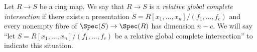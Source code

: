 \begin{definition}
\label{definition-relative-global-complete-intersection}
Let $R \to S$ be a ring map. We say that $R \to S$ is
a {\it relative global complete intersection} if there exists
a presentation $S = R[x_1, \ldots, x_n]/(f_1, \ldots, f_c)$ and
every nonempty fibre of $\Spec(S) \to \Spec(R)$ has dimension $n - c$.
We will say ``let $S = R[x_1, \ldots, x_n]/(f_1, \ldots, f_c)$ be a relative
global complete intersection'' to indicate this situation.
\end{definition}